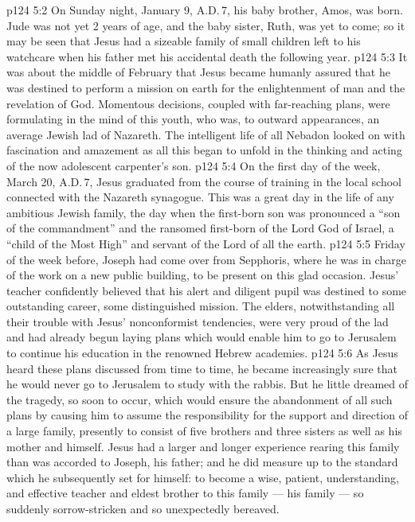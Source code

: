 \vs p124 5:2 On Sunday night, January 9, A.D.\,7, his baby brother, Amos, was born. Jude was not yet 2 years of age, and the baby sister, Ruth, was yet to come; so it may be seen that Jesus had a sizeable family of small children left to his watchcare when his father met his accidental death the following year.
\vs p124 5:3 \pc It was about the middle of February that Jesus became humanly assured that he was destined to perform a mission on earth for the enlightenment of man and the revelation of God. Momentous decisions, coupled with far\hyp{}reaching plans, were formulating in the mind of this youth, who was, to outward appearances, an average Jewish lad of Nazareth. The intelligent life of all Nebadon looked on with fascination and amazement as all this began to unfold in the thinking and acting of the now adolescent carpenter’s son.
\vs p124 5:4 \pc On the first day of the week, March 20, A.D.\,7, Jesus graduated from the course of training in the local school connected with the Nazareth synagogue. This was a great day in the life of any ambitious Jewish family, the day when the first\hyp{}born son was pronounced a “son of the commandment” and the ransomed first\hyp{}born of the Lord God of Israel, a “child of the Most High” and servant of the Lord of all the earth.
\vs p124 5:5 Friday of the week before, Joseph had come over from Sepphoris, where he was in charge of the work on a new public building, to be present on this glad occasion. Jesus’ teacher confidently believed that his alert and diligent pupil was destined to some outstanding career, some distinguished mission. The elders, notwithstanding all their trouble with Jesus’ nonconformist tendencies, were very proud of the lad and had already begun laying plans which would enable him to go to Jerusalem to continue his education in the renowned Hebrew academies.
\vs p124 5:6 As Jesus heard these plans discussed from time to time, he became increasingly sure that he would never go to Jerusalem to study with the rabbis. But he little dreamed of the tragedy, so soon to occur, which would ensure the abandonment of all such plans by causing him to assume the responsibility for the support and direction of a large family, presently to consist of five brothers and three sisters as well as his mother and himself. Jesus had a larger and longer experience rearing this family than was accorded to Joseph, his father; and he did measure up to the standard which he subsequently set for himself: to become a wise, patient, understanding, and effective teacher and eldest brother to this family --- his family --- so suddenly sorrow\hyp{}stricken and so unexpectedly bereaved.
